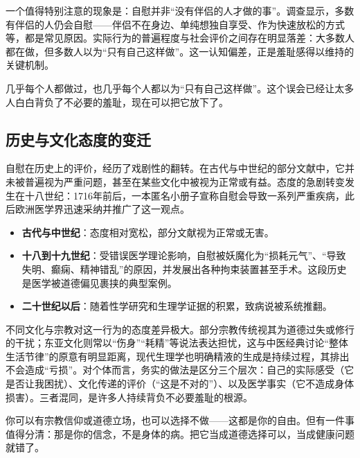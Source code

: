 \documentclass[12pt,UTF8]{ctexbook}
\begin{document}
一个值得特别注意的现象是：自慰并非“没有伴侣的人才做的事”。调查显示，多数有伴侣的人仍会自慰——伴侣不在身边、单纯想独自享受、作为快速放松的方式等，都是常见原因。实际行为的普遍程度与社会评价之间存在明显落差：大多数人都在做，但多数人以为“只有自己这样做”。这一认知偏差，正是羞耻感得以维持的关键机制。

\begin{tcolorbox}[colback=pink!5!white,colframe=red!50!black,title=贴心小叮咛]
几乎每个人都做过，也几乎每个人都以为“只有自己这样做”。这个误会已经让太多人白白背负了不必要的羞耻，现在可以把它放下了。
\end{tcolorbox}

\subsection{历史与文化态度的变迁}

自慰在历史上的评价，经历了戏剧性的翻转。在古代与中世纪的部分文献中，它并未被普遍视为严重问题，甚至在某些文化中被视为正常或有益。态度的急剧转变发生在十八世纪：1716年前后，一本匿名小册子宣称自慰会导致一系列严重疾病，此后欧洲医学界迅速采纳并推广了这一观点。

\begin{itemize}
\item \textbf{古代与中世纪}：态度相对宽松，部分文献视为正常或无害。
\item \textbf{十八到十九世纪}：受错误医学理论影响，自慰被妖魔化为“损耗元气”、“导致失明、癫痫、精神错乱”的原因，并发展出各种拘束装置甚至手术。这段历史是医学被道德偏见裹挟的典型案例。
\item \textbf{二十世纪以后}：随着性学研究和生理学证据的积累，致病说被系统推翻。
\end{itemize}

不同文化与宗教对这一行为的态度差异极大。部分宗教传统视其为道德过失或修行的干扰；东亚文化则常以“伤身”“耗精”等说法表达担忧，这与中医经典讨论“整体生活节律”的原意有明显距离，现代生理学也明确精液的生成是持续过程，其排出不会造成“亏损”。对个体而言，务实的做法是区分三个层次：自己的实际感受（它是否让我困扰）、文化传递的评价（“这是不对的”）、以及医学事实（它不造成身体损害）。三者混同，是许多人持续背负不必要羞耻的根源。

\begin{tcolorbox}[colback=pink!5!white,colframe=red!50!black,title=贴心小叮咛]
你可以有宗教信仰或道德立场，也可以选择不做——这都是你的自由。但有一件事值得分清：那是你的信念，不是身体的病。把它当成道德选择可以，当成健康问题就错了。
\end{tcolorbox}
\end{document}
